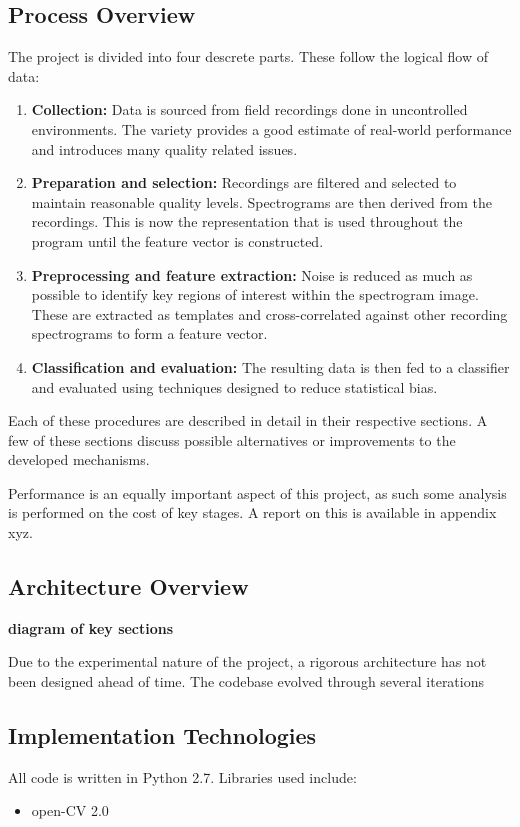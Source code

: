 \subsection{Process Overview}
The project is divided into four descrete parts.
These follow the logical flow of data:
\begin{enumerate}
  \item \textbf{Collection:}
    Data is sourced from field recordings done in uncontrolled environments.
    The variety provides a good estimate of real-world performance and
    introduces many quality related issues.

  \item \textbf{Preparation and selection:}
    Recordings are filtered and selected to maintain reasonable quality levels.
    Spectrograms are then derived from the recordings.
    This is now the representation that is used throughout the program until
    the feature vector is constructed.

  \item \textbf{Preprocessing and feature extraction:}
    Noise is reduced as much as possible to identify key regions of interest
    within the spectrogram image.
    These are extracted as templates and cross-correlated against other
    recording spectrograms to form a feature vector.

  \item \textbf{Classification and evaluation:}
    The resulting data is then fed to a classifier and evaluated using techniques
    designed to reduce statistical bias.
\end{enumerate}

Each of these procedures are described in detail in their respective sections.
A few of these sections discuss possible alternatives or improvements to the
developed mechanisms.

Performance is an equally important aspect of this project, as such some
analysis is performed on the cost of key stages.
A report on this is available in appendix xyz.

\subsection{Architecture Overview}
\textbf{diagram of key sections}

Due to the experimental nature of the project, a rigorous architecture has not
been designed ahead of time.
The codebase evolved through several iterations 


\subsection{Implementation Technologies}
All code is written in Python 2.7.
Libraries used include:
\begin{itemize}
  \item open-CV 2.0
\end{itemize}
